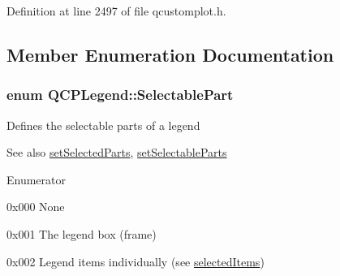 Definition at line 2497 of file qcustomplot.\+h.



\subsection{Member Enumeration Documentation}
\hypertarget{class_q_c_p_legend_a5404de8bc1e4a994ca4ae69e2c7072f1}{}
\subsubsection[{Selectable\+Part}]{\setlength{\rightskip}{0pt plus 5cm}enum {\bf Q\+C\+P\+Legend\+::\+Selectable\+Part}}\label{class_q_c_p_legend_a5404de8bc1e4a994ca4ae69e2c7072f1}
Defines the selectable parts of a legend

\begin{DoxySeeAlso}{See also}
\hyperlink{class_q_c_p_legend_a2aee309bb5c2a794b1987f3fc97f8ad8}{set\+Selected\+Parts}, \hyperlink{class_q_c_p_legend_a9ce60aa8bbd89f62ae4fa83ac6c60110}{set\+Selectable\+Parts} 
\end{DoxySeeAlso}
\begin{Desc}
\item[Enumerator]\par
\begin{description}
\item[{\em 
\hypertarget{class_q_c_p_legend_a5404de8bc1e4a994ca4ae69e2c7072f1a378201c07d500af7126e3ec91652eed7}{}sp\+None\label{class_q_c_p_legend_a5404de8bc1e4a994ca4ae69e2c7072f1a378201c07d500af7126e3ec91652eed7}
}]{\ttfamily 0x000} None \item[{\em 
\hypertarget{class_q_c_p_legend_a5404de8bc1e4a994ca4ae69e2c7072f1a0fa4758962a46fa1dc9da818abae23c4}{}sp\+Legend\+Box\label{class_q_c_p_legend_a5404de8bc1e4a994ca4ae69e2c7072f1a0fa4758962a46fa1dc9da818abae23c4}
}]{\ttfamily 0x001} The legend box (frame) \item[{\em 
\hypertarget{class_q_c_p_legend_a5404de8bc1e4a994ca4ae69e2c7072f1a768bfb95f323db4c66473375032c0af7}{}sp\+Items\label{class_q_c_p_legend_a5404de8bc1e4a994ca4ae69e2c7072f1a768bfb95f323db4c66473375032c0af7}
}]{\ttfamily 0x002} Legend items individually (see \hyperlink{class_q_c_p_legend_ac93eaf236e911d67aa8b88942ef45c5e}{selected\+Items}) \end{description}
\end{Desc}


